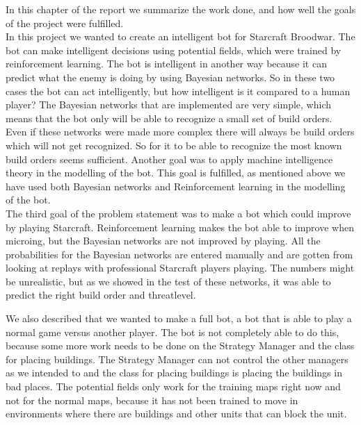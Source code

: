 In this chapter of the report we summarize the work done, and how well the goals of the project were fulfilled. \\

In this project we wanted to create an intelligent bot for Starcraft Broodwar. The bot can make intelligent decisions using potential fields, which 
were trained by reinforcement learning. The bot is intelligent in another way because it can predict what the enemy is doing by using Bayesian networks. 
So in these two cases the bot can act intelligently, but how intelligent is it compared to a human player? The Bayesian networks that are implemented are 
very simple, which means that the bot only will be able to recognize a small set of build orders. Even if these networks were made more complex there 
will always be build orders which will not get recognized. So for it to be able to recognize the most known build orders seems sufficient. 
Another goal was to apply machine intelligence theory in the modelling of the bot. This goal is fulfilled, as mentioned above we have used both 
Bayesian networks and Reinforcement learning in the modelling of the bot.\\

The third goal of the problem statement was to make a bot which could improve by playing Starcraft. 
Reinforcement learning makes the bot able to improve when microing, but the Bayesian networks are not improved by playing. All the probabilities for the Bayesian networks are entered manually and are gotten from looking at replays with professional Starcraft players playing. The numbers might be unrealistic, 
but as we showed in the test of these networks, it was able to predict the right build order and threatlevel.

We also described that we wanted to make a full bot, a bot that is able to play a normal game versus another player. The bot is not completely able to 
do this, because some more work needs to be done on the Strategy Manager and the class for placing buildings. The Strategy Manager can not control the 
other managers as we intended to and the class for placing buildings is placing the buildings in bad places. The potential fields only work for the 
training maps right now and not for the normal maps, because it has not been trained to move in environments where there are buildings and other units that 
can block the unit. 
